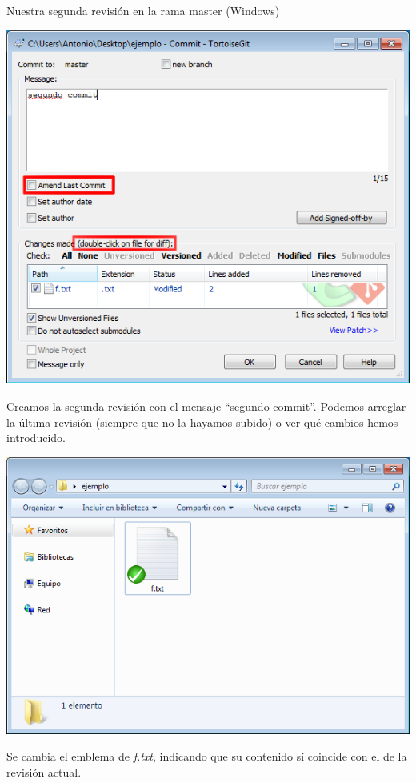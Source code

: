 \documentclass[xcolor=svgnames]{beamer}
\newcommand*{\fichero}[1]{\textit{#1}}
\begin{document}
\begin{frame}{Nuestra segunda revisión en la rama master (Windows)}
\begin{overprint}
    \begin{center}
      \includegraphics[width=\textwidth,height=.6\textheight,keepaspectratio]{tomas/segundocommit-02-dlgcommit}

      Creamos la segunda revisión con el mensaje ``segundo
      commit''. Podemos arreglar la última revisión (siempre que no la
      hayamos subido) o ver qué cambios hemos introducido.
    \end{center}

    \begin{center}
      \includegraphics[width=\textwidth,height=.6\textheight,keepaspectratio]{tomas/segundocommit-03-emblemok}

      Se cambia el emblema de \fichero{f.txt}, indicando que su contenido sí coincide con el de la revisión actual.
    \end{center}
  \end{overprint}
\end{frame}
\end{document}

